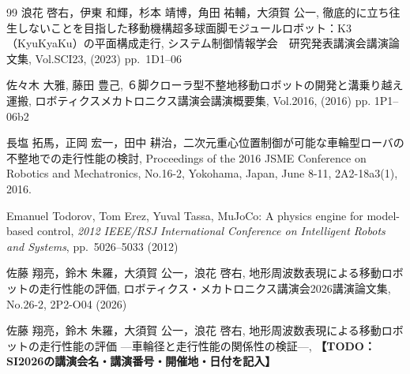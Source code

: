 \documentclass[uplatex,dvipdfmx]{jsarticle}
\newcommand{\todo}[1]{\textbf{【TODO：#1】}}
\begin{document}
\begin{thebibliography}{99}
浪花 啓右，伊東 和輝，杉本 靖博，角田 祐輔，大須賀 公一, 徹底的に立ち往生しないことを目指した移動機構超多球面脚モジュールロボット：K3（KyuKyaKu）の平面構成走行, システム制御情報学会　研究発表講演会講演論文集, Vol.SCI23, (2023) pp.~1D1--06

佐々木 大雅, 藤田 豊己, ６脚クローラ型不整地移動ロボットの開発と溝乗り越え運搬, ロボティクスメカトロニクス講演会講演概要集, Vol.2016, (2016) pp. 1P1--06b2

長塩 拓馬，正岡 宏一，田中 耕治，二次元重心位置制御が可能な車輪型ローバの不整地での走行性能の検討, Proceedings of the 2016 JSME Conference on Robotics and Mechatronics, No.16-2, Yokohama, Japan, June 8-11, 2A2-18a3(1), 2016.

Emanuel Todorov, Tom Erez, Yuval Tassa, MuJoCo: A physics engine for model-based control, {\em 2012 IEEE/RSJ International Conference on Intelligent Robots and Systems}, pp.~5026--5033 (2012)

佐藤 翔亮，鈴木 朱羅，大須賀 公一，浪花 啓右, 地形周波数表現による移動ロボットの走行性能の評価, ロボティクス・メカトロニクス講演会2026講演論文集, No.26-2, 2P2-O04 (2026)

佐藤 翔亮，鈴木 朱羅，大須賀 公一，浪花 啓右, 地形周波数表現による移動ロボットの走行性能の評価 ---車輪径と走行性能の関係性の検証---, \todo{SI2026の講演会名・講演番号・開催地・日付を記入}

\end{thebibliography}
\end{document}

